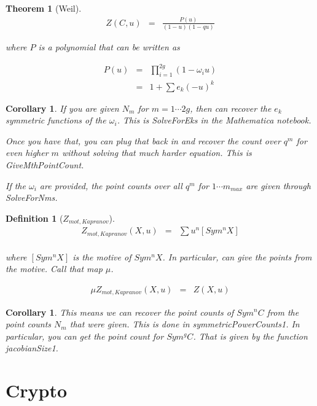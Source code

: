 \documentclass[11pt]{article}
\theoremstyle{change}
\newtheorem{definition}[equation]{Definition}
\newtheorem{thm}[equation]{Theorem}
\newtheorem{cor}[equation]{Corollary}
\theoremstyle{nonumberplain}
\numberwithin{equation}{section}
\begin{document}
\begin{thm}[Weil]
\begin{eqnarray*}
Z (C,u) &=& \frac{P(u)}{(1-u)(1-q u)}
\end{eqnarray*}

where $P$ is a polynomial that can be written as

\begin{eqnarray*}
P(u) &=& \prod_{i=1}^{2g} (1- \omega_i u)\\
&=& 1 + \sum e_k (-u)^k
\end{eqnarray*}

\end{thm}

\begin{cor}
If you are given $N_m$ for $m=1 \cdots 2g$, then can recover the $e_k$ symmetric functions of the $\omega_i$. This is SolveForEks in the Mathematica notebook.

Once you have that, you can plug that back in and recover the count over $q^m$ for even higher $m$ without solving that much harder equation. This is GiveMthPointCount.

If the $\omega_i$ are provided, the point counts over all $q^m$ for $1 \cdots m_{max}$ are given through SolveForNms.
\end{cor}

\begin{definition}[$Z_{mot,Kapranov}$]
\begin{eqnarray*}
Z_{mot,Kapranov} (X,u) &=& \sum u^n [Sym^n X]\\
\end{eqnarray*}

where $[Sym^n X]$ is the motive of $Sym^n X$. In particular, can give the points from the motive. Call that map $\mu$.

\begin{eqnarray*}
\mu Z_{mot,Kapranov} (X,u) &=& Z(X,u)
\end{eqnarray*}

\end{definition}

\begin{cor}
This means we can recover the point counts of $Sym^n C$ from the point counts $N_m$ that were given. This is done in symmetricPowerCounts1. In particular, you can get the point count for $Sym^g C$. That is given by the function jacobianSize1.
\end{cor}

\section{Crypto}
\end{document}
